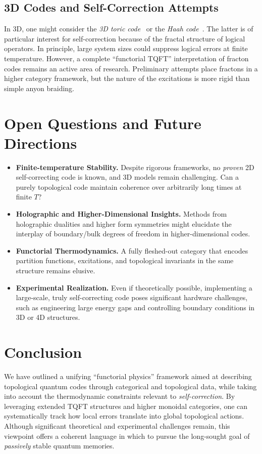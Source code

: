 \documentclass[12pt]{article}
\begin{document}
\subsection{3D Codes and Self-Correction Attempts}
In 3D, one might consider the \emph{3D toric code}~\cite{castelnovo2008topological} or the \emph{Haah code}~\cite{haah2011local}. The latter is of particular interest for self-correction because of the fractal structure of logical operators. In principle, large system sizes could suppress logical errors at finite temperature. However, a complete “functorial TQFT” interpretation of fracton codes remains an active area of research. Preliminary attempts place fractons in a higher category framework, but the nature of the excitations is more rigid than simple anyon braiding.

\section{Open Questions and Future Directions}
\begin{itemize}
    \item \textbf{Finite-temperature Stability.} Despite rigorous frameworks, no \emph{proven} 2D self-correcting code is known, and 3D models remain challenging. Can a purely topological code maintain coherence over arbitrarily long times at finite $T$?
    \item \textbf{Holographic and Higher-Dimensional Insights.} Methods from holographic dualities and higher form symmetries might elucidate the interplay of boundary/bulk degrees of freedom in higher-dimensional codes.
    \item \textbf{Functorial Thermodynamics.} A fully fleshed-out category that encodes partition functions, excitations, and topological invariants in the same structure remains elusive.
    \item \textbf{Experimental Realization.} Even if theoretically possible, implementing a large-scale, truly self-correcting code poses significant hardware challenges, such as engineering large energy gaps and controlling boundary conditions in 3D or 4D structures.
\end{itemize}

\section{Conclusion}
We have outlined a unifying “functorial physics” framework aimed at describing topological quantum codes through categorical and topological data, while taking into account the thermodynamic constraints relevant to \emph{self-correction}. By leveraging extended TQFT structures and higher monoidal categories, one can systematically track how local errors translate into global topological actions. Although significant theoretical and experimental challenges remain, this viewpoint offers a coherent language in which to pursue the long-sought goal of \emph{passively} stable quantum memories.
\end{document}
